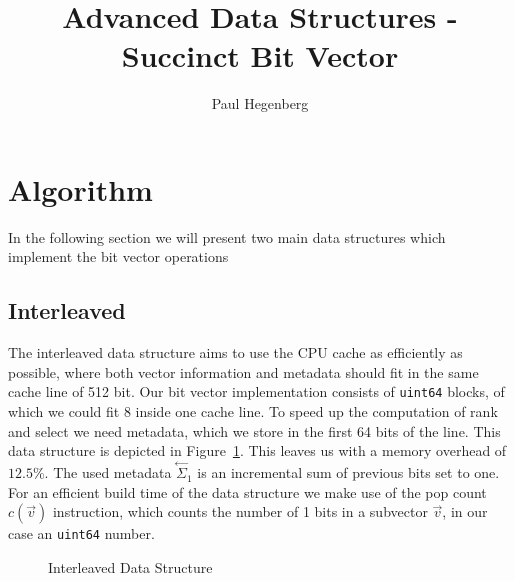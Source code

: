 \documentclass[a4paper,UKenglish,cleveref, autoref, thm-restate]{lipics-v2021}
\title{Advanced Data Structures - Succinct Bit Vector}
\author{Paul Hegenberg}{Karlsruher Institut für Technologie, Germany \and \url{https://blog.hegenberg.dev} }{urlgh@student.kit.edu}{}{}%
\def\code#1{\texttt{#1}}
\newcommand\prevsum[0]{\ensuremath{\overset{\leftarrow}{\Sigma}_1}}
\begin{document}
\maketitle

\begin{abstract}
\end{abstract}

\section{Algorithm}
In the following section we will present two main data structures which implement the bit vector
operations 

\subsection{Interleaved}
The interleaved data structure aims to use the CPU cache as efficiently as possible, where both
vector information and metadata should fit in the same cache line of 512 bit.
Our bit vector implementation consists of \code{uint64} blocks, of which we could fit 8 inside one cache line.
To speed up the computation of rank and select we need metadata, which we store in the first
64 bits of the line. This data structure is depicted in Figure~\ref{fig:interleaved}. 
This leaves us with a memory overhead of $12.5\%$. The used metadata $\prevsum$ is an incremental sum of previous bits
set to one. For an efficient build time of the data structure we make use of the pop count $c(\vec{v})$
instruction, which counts the number of 1 bits in a subvector $\vec{v}$, in our case an \code{uint64} number.

\begin{figure}[htbp]
    \centering
    \tikzfading[name=fade right,
            left color=transparent!0,
            right color=transparent!100]
        \tikzfading[name=fade left,
            left color=transparent!100,
            right color=transparent!0]
    \caption{Interleaved Data Structure}
    \label{fig:interleaved}    
\end{figure}
\end{document}
